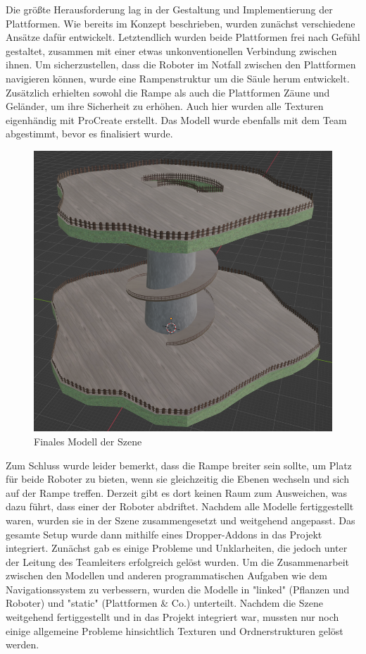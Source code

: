 Die größte Herausforderung lag in der Gestaltung und Implementierung der Plattformen. Wie bereits im Konzept beschrieben, wurden zunächst verschiedene Ansätze dafür entwickelt. Letztendlich wurden beide Plattformen frei nach Gefühl gestaltet, zusammen mit einer etwas unkonventionellen Verbindung zwischen ihnen. Um sicherzustellen, dass die Roboter im Notfall zwischen den Plattformen navigieren können, wurde eine Rampenstruktur um die Säule herum entwickelt. \cite{YouTube_2020} Zusätzlich erhielten sowohl die Rampe als auch die Plattformen Zäune und Geländer, um ihre Sicherheit zu erhöhen. Auch hier wurden alle Texturen eigenhändig mit ProCreate erstellt. Das Modell wurde ebenfalls mit dem Team abgestimmt, bevor es finalisiert wurde.
\begin{figure}[H]
	\centering
	\includegraphics[height=0.3\pageheight,keepaspectratio]{pics/13}
	\caption{Finales Modell der Szene}
\end{figure}
Zum Schluss wurde leider bemerkt, dass die Rampe breiter sein sollte, um Platz für beide Roboter zu bieten, wenn sie gleichzeitig die Ebenen wechseln und sich auf der Rampe treffen. Derzeit gibt es dort keinen Raum zum Ausweichen, was dazu führt, dass einer der Roboter abdriftet.
Nachdem alle Modelle fertiggestellt waren, wurden sie in der Szene zusammengesetzt und weitgehend angepasst. Das gesamte Setup wurde dann mithilfe eines Dropper-Addons in das Projekt integriert. Zunächst gab es einige Probleme und Unklarheiten, die jedoch unter der Leitung des Teamleiters erfolgreich gelöst wurden. Um die Zusammenarbeit zwischen den Modellen und anderen programmatischen Aufgaben wie dem Navigationssystem zu verbessern, wurden die Modelle in "linked" (Pflanzen und Roboter) und "static" (Plattformen \& Co.) unterteilt.
Nachdem die Szene weitgehend fertiggestellt und in das Projekt integriert war, mussten nur noch einige allgemeine Probleme hinsichtlich Texturen und Ordnerstrukturen gelöst werden.


